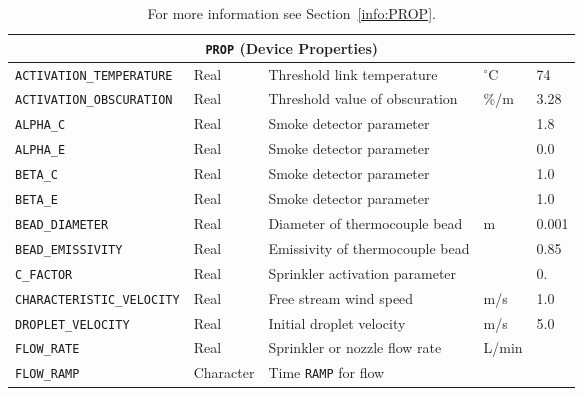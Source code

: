 \documentclass[11pt]{book}
\newcommand{\ct}{\tt\small}
\begin{document}
\begin{table}[H]
\caption{For more information see Section~\ref{info:PROP}.}\label{tbl:PROP}
\noindent
\begin{tabular*}{\textwidth}{@{\extracolsep{\fill}}|l|l|l|l|l|}
\hline
\multicolumn{5}{|c|}{{\ct PROP} (Device Properties)} \\ \hline \hline
{\ct ACTIVATION\_TEMPERATURE}           & Real          & Threshold link temperature       & $^\circ$C             & 74        \\ \hline
{\ct ACTIVATION\_OBSCURATION}           & Real          & Threshold value of obscuration   & \%/m                  & 3.28      \\ \hline
{\ct ALPHA\_C}                          & Real          & Smoke detector parameter         &                       & 1.8       \\ \hline
{\ct ALPHA\_E}                          & Real          & Smoke detector parameter         &                       & 0.0       \\ \hline
{\ct BETA\_C}                           & Real          & Smoke detector parameter         &                       & 1.0       \\ \hline
{\ct BETA\_E}                           & Real          & Smoke detector parameter         &                       & 1.0       \\ \hline
{\ct BEAD\_DIAMETER}                    & Real          & Diameter of thermocouple bead    & m                     & 0.001     \\ \hline
{\ct BEAD\_EMISSIVITY}                  & Real          & Emissivity of thermocouple bead  &                       & 0.85      \\ \hline
{\ct C\_FACTOR}                         & Real          & Sprinkler activation parameter   &                       & 0.        \\ \hline
{\ct CHARACTERISTIC\_VELOCITY}          & Real          & Free stream wind speed           & m/s                   & 1.0       \\ \hline
{\ct DROPLET\_VELOCITY}                 & Real          & Initial droplet velocity         & m/s                   & 5.0       \\ \hline
{\ct FLOW\_RATE}                        & Real          & Sprinkler or nozzle flow rate    & L/min                 &           \\ \hline
{\ct FLOW\_RAMP}                        & Character     & Time {\ct RAMP} for flow         &                       &           \\ \hline

\end{tabular*}
\end{table}
\end{document}
